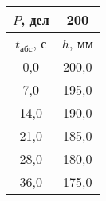 \begin{tabular}[t]{|c|c|}
\hline
$P$, дел & 200 \\
\hline
$t_{абс}$, с & $h$, мм \\ 
\hline
0,0 & 200,0 \\ 
7,0 & 195,0 \\ 
14,0 & 190,0 \\ 
21,0 & 185,0 \\ 
28,0 & 180,0 \\ 
36,0 & 175,0 \\ 
\hline
\end{tabular}